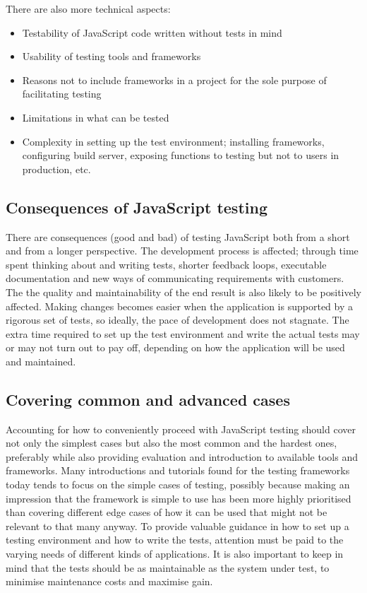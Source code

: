 \documentclass[11pt]{article}
\begin{document}
There are also more technical aspects:
\begin{itemize}
\item Testability of JavaScript code written without tests in mind
\item Usability of testing tools and frameworks
\item Reasons not to include frameworks in a project for the sole purpose of facilitating testing
\item Limitations in what can be tested
\item Complexity in setting up the test environment; installing frameworks, configuring build server, exposing functions to testing but not to users in production, etc.
\end{itemize}

\subsection{Consequences of JavaScript testing}

There are consequences (good and bad) of testing JavaScript both from a short and from a longer perspective. The development process is affected; through time spent thinking about and writing tests, shorter feedback loops, executable documentation and new ways of communicating requirements with customers. The the quality and maintainability of the end result is also likely to be positively affected. Making changes becomes easier when the application is supported by a rigorous set of tests, so ideally, the pace of development does not stagnate. The extra time required to set up the test environment and write the actual tests may or may not turn out to pay off, depending on how the application will be used and maintained.

\subsection{Covering common and advanced cases}

Accounting for how to conveniently proceed with JavaScript testing should cover not only the simplest cases but also the most common and the hardest ones, preferably while also providing evaluation and introduction to available tools and frameworks. Many introductions and tutorials found for the testing frameworks today tends to focus on the simple cases of testing, possibly because making an impression that the framework is simple to use has been more highly prioritised than covering different edge cases of how it can be used that might not be relevant to that many anyway. To provide valuable guidance in how to set up a testing environment and how to write the tests, attention must be paid to the varying needs of different kinds of applications. It is also important to keep in mind that the tests should be as maintainable as the system under test, to minimise maintenance costs and maximise gain.
\end{document}
